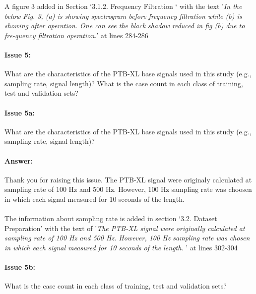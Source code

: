 \documentclass{article}
\begin{document}
A figure 3 added in Section `3.1.2. Frequency Filtration ` with the text '\textit{In the below Fig. 3, (a) is showing spectrogram before frequency filtration while (b) is showing after operation. One can see the black shadow reduced in fig (b) due to fre-quency filtration operation.}' at lines 284-286

\paragraph{Issue 5:}
\begin{displayquote}
What are the characteristics of the PTB-XL base signals used in this study (e.g., sampling rate, signal length)? What is the case count in each class of training, test and validation sets?
\end{displayquote}

\paragraph{Issue 5a:}
\begin{displayquote}
What are the characteristics of the PTB-XL base signals used in this study (e.g., sampling rate, signal length)?
\end{displayquote}

\paragraph{Answer:}
Thank you for raising this issue. The PTB-XL signal were originaly calculated at sampling rate of 100 Hz and 500 Hz. However, 100 Hz sampling rate was choosen in which each signal measured for 10 seconds of the length. \\\\

The information about sampling rate is added in section `3.2. Dataset Preparation' with the text of '\textit{The PTB-XL signal were originally calculated at sampling rate of 100 Hz and 500 Hz. However, 100 Hz sampling rate was chosen in which each signal measured for 10 seconds of the length. }' at lines 302-304

\paragraph{Issue 5b:}
\begin{displayquote}
What is the case count in each class of training, test and validation sets?
\end{displayquote}
\end{document}
